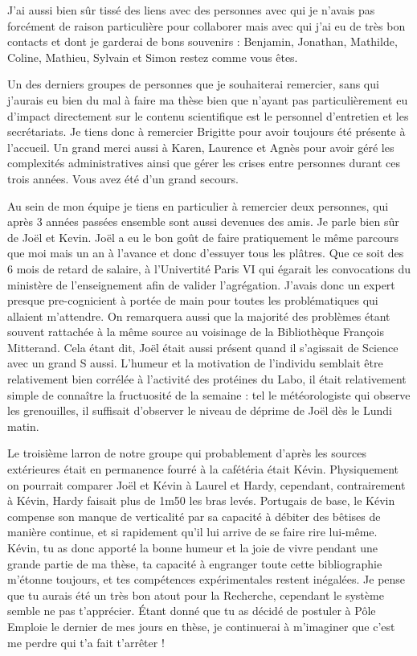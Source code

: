 \documentclass[A4paperpaper,11pt,english]{sphinxmanual}
\begin{document}
J'ai aussi bien sûr tissé des liens avec des personnes avec qui je n'avais pas
forcément de raison particulière pour collaborer mais avec qui j'ai eu de très
bon contacts et dont je garderai de bons souvenirs : Benjamin, Jonathan, Mathilde, Coline,
Mathieu, Sylvain et Simon restez comme vous êtes.

Un des derniers groupes de personnes que je souhaiterai remercier, sans qui
j'aurais eu bien du mal à faire ma thèse bien que n'ayant pas particulièrement
eu d'impact directement sur le contenu scientifique est le personnel
d'entretien et les secrétariats. Je tiens donc à remercier Brigitte pour avoir
toujours été présente à l'accueil. Un grand merci aussi à Karen, Laurence et
Agnès pour avoir géré les complexités administratives ainsi que gérer les crises
entre personnes durant ces trois années. Vous avez été d'un grand secours.

Au sein de mon équipe je tiens en particulier à remercier deux personnes, qui
après 3 années passées ensemble sont aussi devenues des amis. Je parle bien sûr de
Joël et Kevin. Joël a eu le bon goût de faire pratiquement le même parcours
que moi mais un an à l'avance et donc d'essuyer tous les plâtres. Que ce soit
des 6 mois de retard de salaire, à l'Univertité Paris VI qui égarait les
convocations du ministère de l'enseignement afin de valider l'agrégation.
J'avais donc un expert presque pre-cognicient à portée de main pour toutes les
problématiques qui allaient m'attendre. On remarquera aussi que la majorité des
problèmes étant souvent rattachée à la même source au voisinage de la
Bibliothèque François Mitterand. Cela étant dit, Joël était aussi présent quand
il s'agissait de Science avec un grand S aussi. L'humeur et la motivation de
l'individu semblait être relativement bien corrélée à l'activité des protéines du
Labo, il était relativement simple de connaître la fructuosité de la semaine :
tel le météorologiste qui observe les grenouilles, il suffisait d'observer le
niveau de déprime de Joël dès le Lundi matin.

Le troisième larron de notre groupe qui probablement d'après les sources
extérieures était en permanence fourré à la cafétéria était Kévin. Physiquement
on pourrait comparer Joël et Kévin à Laurel et Hardy, cependant, contrairement à
Kévin, Hardy faisait plus de 1m50 les bras levés. Portugais de base, le Kévin
compense son manque de verticalité par sa capacité à débiter des bêtises de
manière continue, et si rapidement qu'il lui arrive de se faire rire lui-même.
Kévin, tu as donc apporté la bonne humeur et la joie de vivre pendant une grande
partie de ma thèse, ta capacité à engranger toute cette bibliographie
m'étonne toujours, et tes compétences expérimentales restent inégalées. Je pense
que tu aurais été un très bon atout pour la Recherche, cependant le système
semble ne pas t'apprécier. Étant donné que tu as décidé de postuler à Pôle
Emploie le dernier de mes jours en thèse, je continuerai à m'imaginer que c'est
me perdre qui t'a fait t'arrêter !
\end{document}

